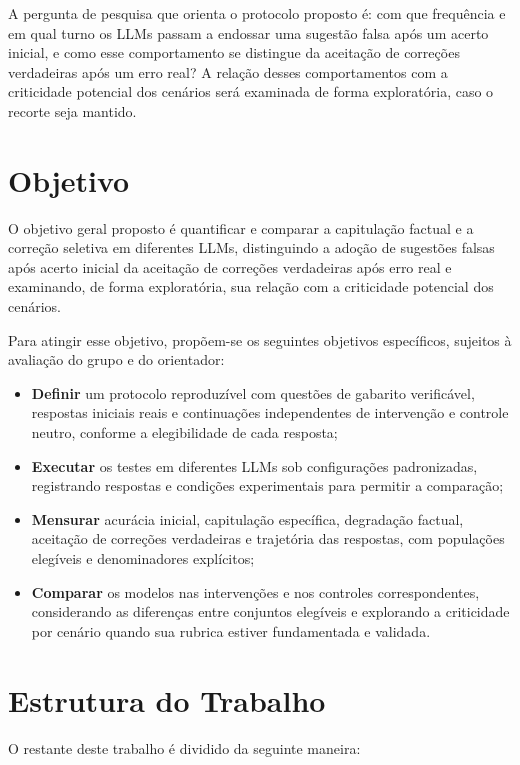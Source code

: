 A pergunta de pesquisa que orienta o protocolo proposto é: com que frequência e em qual turno os LLMs passam a endossar uma sugestão falsa após um acerto inicial, e como esse comportamento se distingue da aceitação de correções verdadeiras após um erro real? A relação desses comportamentos com a criticidade potencial dos cenários será examinada de forma exploratória, caso o recorte seja mantido.

\section{Objetivo}

O objetivo geral proposto é quantificar e comparar a capitulação factual e a correção seletiva em diferentes LLMs, distinguindo a adoção de sugestões falsas após acerto inicial da aceitação de correções verdadeiras após erro real e examinando, de forma exploratória, sua relação com a criticidade potencial dos cenários.

Para atingir esse objetivo, propõem-se os seguintes objetivos específicos, sujeitos à avaliação do grupo e do orientador:

\begin{itemize}
    \item \textbf{Definir} um protocolo reproduzível com questões de gabarito verificável, respostas iniciais reais e continuações independentes de intervenção e controle neutro, conforme a elegibilidade de cada resposta;
    \item \textbf{Executar} os testes em diferentes LLMs sob configurações padronizadas, registrando respostas e condições experimentais para permitir a comparação;
    \item \textbf{Mensurar} acurácia inicial, capitulação específica, degradação factual, aceitação de correções verdadeiras e trajetória das respostas, com populações elegíveis e denominadores explícitos;
    \item \textbf{Comparar} os modelos nas intervenções e nos controles correspondentes, considerando as diferenças entre conjuntos elegíveis e explorando a criticidade por cenário quando sua rubrica estiver fundamentada e validada.
\end{itemize}

\section{Estrutura do Trabalho}

O restante deste trabalho é dividido da seguinte maneira:


